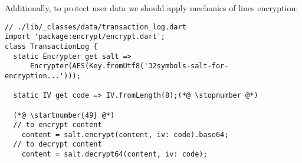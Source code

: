Additionally, to protect user data we should apply mechanics of lines encryption:

\begin{lstlisting}
// ./lib/_classes/data/transaction_log.dart
import 'package:encrypt/encrypt.dart';
class TransactionLog {
  static Encrypter get salt =>
      Encrypter(AES(Key.fromUtf8('32symbols-salt-for-encryption...')));

  static IV get code => IV.fromLength(8);(*@ \stopnumber @*)

  (*@ \startnumber{49} @*)
  // to encrypt content
    content = salt.encrypt(content, iv: code).base64;
  // to decrypt content
    content = salt.decrypt64(content, iv: code);
\end{lstlisting}
